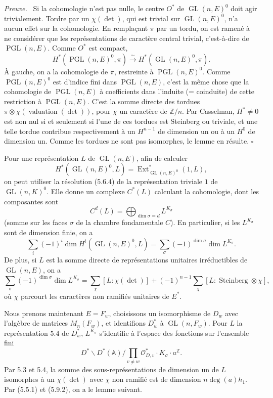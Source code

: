 \documentclass[10pt]{article}
\newcommand{\Z}{\mathbb Z}
\newcommand{\Adele}{\mathbb A}
\newcommand{\GL}{\operatorname{GL}}
\newcommand{\val}{\operatorname{valuation}}
\newcommand{\PGL}{\operatorname{PGL}}
\newcommand{\degm}{\operatorname{deg}}
\theoremstyle{deligne}
\newenvironment{proofdel}[1][Preuve.]{\textit{#1}\ }{\hfill$\square$}
\newcommand{\Ext}{\operatorname{Ext}}
\newcommand{\Stein}{\operatorname{Steinberg}}
\newcommand{\heading}[1]{\vspace{0.7em}\noindent{\bfseries #1}\quad}
\begin{document}
\begin{proofdel}[Preuve.]
Si la cohomologie n'est pas nulle, le centre $O^*$ de $\GL(n,E)^0$ doit agir trivialement. Tordre par un $\chi(\det)$, qui est trivial sur $\GL(n,E)^0$, n'a aucun effet sur la cohomologie. En remplaçant $\pi$ par un tordu, on est ramené à ne considérer que les représentations de caractère central trivial, c'est-à-dire de $\PGL(n,E)$. Comme $O^*$ est compact,
\[
H^*(\PGL(n,E)^0,\pi)\xrightarrow{\sim}H^*(\GL(n,E)^0,\pi).
\]
À gauche, on a la cohomologie de $\pi$, restreinte à $\PGL(n,E)^0$. Comme $\PGL(n,E)^0$ est d'indice fini dans $\PGL(n,E)$, c'est la même chose que la cohomologie de $\PGL(n,E)$ à coefficients dans l'induite (= coinduite) de cette restriction à $\PGL(n,E)$. C'est la somme directe des tordues $\pi\otimes\chi(\val(\det))$, pour $\chi$ un caractère de $\Z/n$. Par Casselman, $H^*\ne0$ est non nul si et seulement si l'une de ces tordues est Steinberg ou triviale, et une telle tordue contribue respectivement à un $H^{n-1}$ de dimension un ou à un $H^0$ de dimension un. Comme les tordues ne sont pas isomorphes, le lemme en résulte.
\end{proofdel}

\heading{5.9.} Pour une représentation $L$ de $\GL(n,E)$, afin de calculer
\[
H^*(\GL(n,E)^0,L)=\Ext^*_{\GL(n,E)^0}(1,L),
\]
on peut utiliser la résolution (5.6.4) de la représentation triviale $1$ de $\GL(n,K)^0$. Elle donne un complexe $C^*(L)$ calculant la cohomologie, dont les composantes sont
\begin{equation}\tag{5.9.1}
C^d(L)=\bigoplus_{\dim\sigma=d} L^{K_\sigma}
\end{equation}
(somme sur les faces $\sigma$ de la chambre fondamentale $C$). En particulier, si les $L^{K_\sigma}$ sont de dimension finie, on a
\[
\sum_i(-1)^i\dim H^i(\GL(n,E)^0,L)=\sum_\sigma(-1)^{\dim\sigma}\dim L^{K_\sigma}.
\]
De plus, si $L$ est la somme directe de représentations unitaires irréductibles de $\GL(n,E)$, on a
\begin{equation}\tag{5.9.2}
\sum_\sigma(-1)^{\dim\sigma}\dim L^{K_\sigma}
=\sum_\chi [L:\chi(\det)]+(-1)^{n-1}\sum_\chi [L:\Stein\otimes\chi],
\end{equation}
où $\chi$ parcourt les caractères non ramifiés unitaires de $E^*$.

\heading{5.10.} Nous prenons maintenant $E=F_w$, choisissons un isomorphisme de $D_w$ avec l'algèbre de matrices $M_n(F_w)$, et identifions $D_w^*$ à $\GL(n,F_w)$. Pour $L$ la représentation 5.4 de $D_w^*$, $L^{K_\sigma}$ s'identifie à l'espace des fonctions sur l'ensemble fini
\[
D^*\backslash D^*(\Adele)/\prod_{v\ne w}\mathcal O_{D,v}^*\cdot K_\sigma\cdot a^\Z.
\]
Par 5.3 et 5.4, la somme des sous-représentations de dimension un de $L$ isomorphes à un $\chi(\det)$ avec $\chi$ non ramifié est de dimension $n\degm(a)h_1$. Par (5.5.1) et (5.9.2), on a le lemme suivant.
\end{document}
